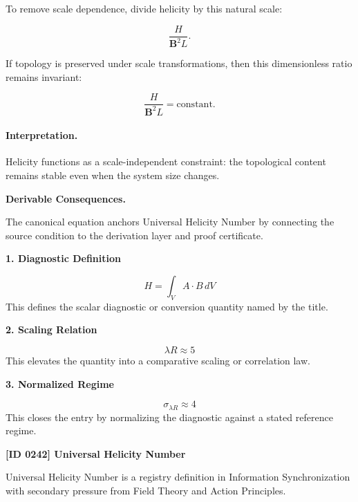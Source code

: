 To remove scale dependence, divide helicity by this natural scale:

\begin{equation}
\frac{H}{\mathbf{B}^2L}.
\end{equation}

If topology is preserved under scale transformations, then this dimensionless ratio remains invariant:

\begin{equation}
\boxed{
\frac{H}{\mathbf{B}^2 L}
=
\mathrm{constant}.
}
\end{equation}

\paragraph{Interpretation.}
Helicity functions as a scale-independent constraint: the topological content remains stable even when the system size changes.

\par\vspace{0.35em}
\noindent\textbf{Derivable Consequences.}\quad
\begingroup
\footnotesize
\raggedright
The canonical equation anchors Universal Helicity Number by connecting the source condition to the derivation layer and proof certificate.
\par\endgroup

\noindent\textbf{1. Diagnostic Definition}\par
\[
H=\int_V A\cdot B\,dV
\]
\noindent This defines the scalar diagnostic or conversion quantity named by the title.\par
\noindent\textbf{2. Scaling Relation}\par
\[
\lambda R\approx 5
\]
\noindent This elevates the quantity into a comparative scaling or correlation law.\par
\noindent\textbf{3. Normalized Regime}\par
\[
\sigma_{\lambda R}\approx 4
\]
\noindent This closes the entry by normalizing the diagnostic against a stated reference regime.\par

\clearpage
\noindent\textbf{[ID 0242] Universal Helicity Number}\par
\vspace{0.35em}
\begingroup\small
{}
Universal Helicity Number is a registry definition in Information Synchronization with secondary pressure from Field Theory and Action Principles.

